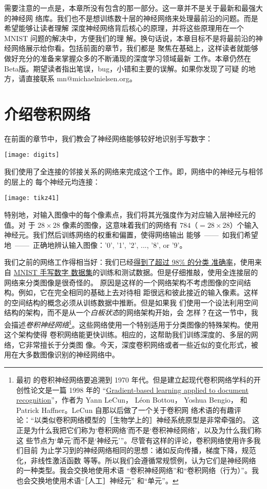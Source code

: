 需要注意的一点是，本章所没有包含的那一部分。这一章并不是关于最新和最强大的神经网
络库。我们也不是想训练数十层的神经网络来处理最前沿的问题。而是希望能够让读者理解
深度神经网络背后核心的原理，并将这些原理用在一个 MNIST 问题的解决中，方便我们的理
解。换句话说，本章目标不是将最前沿的神经网络展示给你看。包括前面的章节，我们都是
聚焦在基础上，这样读者就能够做好充分的准备来掌握众多的不断涌现的深度学习领域最新
工作。本章仍然在Beta版。期望读者指出笔误，bug，小错和主要的误解。如果你发现了可疑
的地方，请直接联系 mn@michaelnielsen.org。

\section{介绍卷积网络}
\label{sec:convolutional_networks}

在前面的章节中，我们教会了神经网络能够较好地识别手写数字：
\begin{center}
  \texttt{[image: digits]}
\end{center}

我们使用了全连接的邻接关系的网络来完成这个工作。即，网络中的神经元与相邻的层上的
每个神经元均连接：
\begin{center}
  \texttt{[image: tikz41]}
\end{center}

特别地，对输入图像中的每个像素点，我们将其光强度作为对应输入层神经元的值。对
于 $28 \times 28$ 像素的图像，这意味着我们的网络有
$784$（$= 28 \times 28$）个输入神经元。我们然后训练网络的权重和偏置，使得网络输出
能够~——~如我们希望地~——~正确地辨认输入图像：'0', '1', '2', ..., '8', or '9'。

我们之前的网络工作得相当好：我们已经\hyperref[98percent]{得到了超过 98\% 的分类
  准确率}，使用来自 \hyperref[sec:learning_with_gradient_descent]{MNIST 手写数字
  数据集}的训练和测试数据。但是仔细推敲，使用全连接层的网络来分类图像是很奇怪的。
原因是这样的一个网络架构不考虑图像的空间结构。例如，它在完全相同的基础上去对待相
距很远和彼此接近的输入像素。这样的空间结构的概念必须从训练数据中推断。但是如果我
们使用一个设法利用空间结构的架构，而不是从一个\emph{白板状态}的网络架构开始，会
怎样？在这一节中，我会描述\emph{卷积神经网络}\footnote{最初
  的卷积神经网络要追溯到 1970 年代。但是建立起现代卷积网络学科的开创性论文是一篇
  1998 年的
  “\href{http://yann.lecun.com/exdb/publis/pdf/lecun-98.pdf}{Gradient-based
    learning applied to document recognition}”，作者为 Yann LeCun， Léon
  Bottou， Yoshua Bengio， 和 Patrick Haffner。LeCun 自那以后做了一个关于卷积网
  络术语的有趣评论：“以类似卷积网络模型的［生物学上的］神经系统原型是非常牵强的。
  这正是为什么我把它们称为‘卷积网络’而不是‘卷积神经网络’，以及为什么我们称这
  些节点为‘单元’而不是‘神经元’”。尽管有这样的评论，卷积网络使用许多我们目前
  为止学习到的神经网络相同的思想：诸如反向传播，梯度下降，规范化，非线性激活函数
  等等。所以我们会遵循常规惯例，认为它们是神经网络的一种类型。我会交换地使用术语
  “卷积神经网络”和“卷积网络（行为）”。我也会交换地使用术语“［人工］神经元”
  和“单元”。}。这些网络使用一个特别适用于分类图像的特殊架构。使用这个架构使得
卷积网络能更快训练。相应的，这帮助我们训练深度的、多层的网络，它非常擅长于分类图
像。今天，深度卷积网络或者一些近似的变化形式，被用在大多数图像识别的神经网络中。

